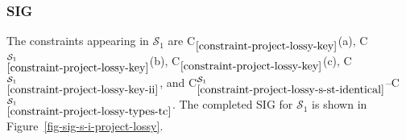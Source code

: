 \documentclass{article}
\newcounter{constraint}
\newcommand{\schema}[1]{\ensuremath{\mathcal{S}_{#1}}}
\newcommand{\Constraint}[2][]{C\ensuremath{_{#2}\ifx&#1&\else^{#1}\fi}}
\begin{document}


\subsubsection{SIG}
\label{sec-sigs-s-i-project-lossy}

\noindent The constraints appearing in \(\schema{1}\) are \Constraint{\ref{constraint-project-lossy-key}}(a), \Constraint[\schema{1}]{\ref{constraint-project-lossy-key}}(b), \Constraint{\ref{constraint-project-lossy-key}}(c), \Constraint[\schema{1}]{\ref{constraint-project-lossy-key-ii}}, and \Constraint[\schema{1}]{\ref{constraint-project-lossy-s-st-identical}}--\Constraint[\schema{1}]{\ref{constraint-project-lossy-types-tc}}. The completed SIG for \(\schema{1}\) is shown in Figure~\ref{fig-sig-s-i-project-lossy}.

\end{document}
